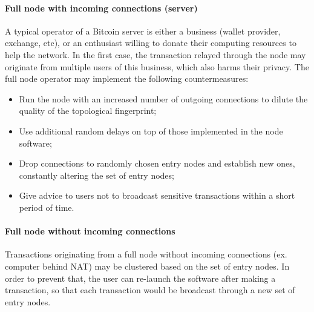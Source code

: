 \paragraph{Full node with incoming connections (server)}
A typical operator of a Bitcoin server is either a business (wallet provider, exchange, etc), or an enthusiast willing to donate their computing resources to help the network.
In the first case, the transaction relayed through the node may originate from multiple users of this business, which also harms their privacy.
The full node operator may implement the following countermeasures:
\begin{itemize}
	\item Run the node with an increased number of outgoing connections to  dilute the quality of the topological fingerprint;
	\item Use additional random delays on top of those implemented in the node software;
	\item Drop connections to randomly chosen entry nodes and establish new ones, constantly altering the set of entry nodes;
	\item Give advice to users not to broadcast sensitive transactions within a short period of time.
\end{itemize}

\paragraph{Full node without incoming connections}
Transactions originating from a full node without incoming connections (ex. computer behind NAT) may be clustered based on the set of entry nodes.
In order to prevent that, the user can re-launch the software after making a transaction, so that each transaction would be broadcast through a new set of entry nodes.

